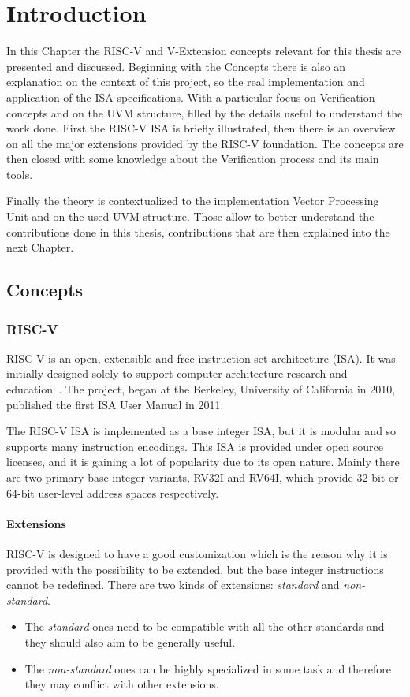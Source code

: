 \chapter{Introduction}
In this Chapter the RISC-V and V-Extension concepts relevant for this thesis are presented and discussed.
Beginning with the Concepts there is also an explanation on the context of this project, so the real implementation and application of the ISA specifications.
With a particular focus on Verification concepts and on the UVM structure, filled by the details useful to understand the work done.
First the RISC-V ISA is briefly illustrated, then there is an overview on all the major extensions provided by the RISC-V foundation. The concepts are then closed with some knowledge about the Verification process and its main tools. 

Finally the theory is contextualized to the implementation Vector Processing Unit and on the used UVM structure. Those allow to better understand the contributions done in this thesis, contributions that are then explained into the next Chapter.






\section{Concepts}
\subsection{RISC-V}
RISC-V is an open, extensible and free instruction set architecture (ISA). It was initially designed solely to support computer architecture research and education~\cite{RISC-V-Instruction-Set-Manual}.
The project, began at the Berkeley, University of California in 2010, published the first ISA User Manual in 2011. 

The RISC-V ISA is implemented as a base integer ISA, but it is modular and so supports many instruction encodings.
This ISA is provided under open source licenses, and it is gaining a lot of popularity due to its open nature. 
Mainly there are two primary base integer variants, RV32I and RV64I, which provide 32-bit or 64-bit user-level address spaces respectively.

\subsubsection{Extensions}

RISC-V is designed to have a good customization which is the reason why it is provided with the possibility to be extended, but the base integer instructions cannot be redeﬁned.
There are two kinds of extensions:
\textit{standard} and \textit{non-standard}.
\begin{itemize}
    \item The \textit{standard} ones need to be compatible with all the other standards and they should also aim to be generally useful.
    \item The \textit{non-standard} ones can be highly specialized in some task and therefore they may conflict with other extensions.
\end{itemize}

